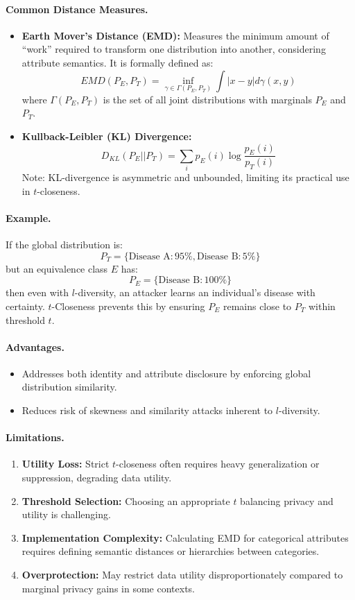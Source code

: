 \documentclass{article}
\begin{document}
\paragraph{Common Distance Measures.}
\begin{itemize}
    \item \textbf{Earth Mover's Distance (EMD):} Measures the minimum amount of ``work'' required to transform one distribution into another, considering attribute semantics. It is formally defined as:
    \[
    EMD(P_E, P_T) = \inf_{\gamma \in \Gamma(P_E, P_T)} \int |x-y| d\gamma(x,y)
    \]
    where $\Gamma(P_E, P_T)$ is the set of all joint distributions with marginals $P_E$ and $P_T$.

    \item \textbf{Kullback-Leibler (KL) Divergence:}
    \[
    D_{KL}(P_E || P_T) = \sum_{i} p_E(i) \log \frac{p_E(i)}{p_T(i)}
    \]
    Note: KL-divergence is asymmetric and unbounded, limiting its practical use in $t$-closeness.

\end{itemize}

\paragraph{Example.}
If the global distribution is:
\[
P_T = \{ \text{Disease A}: 95\%, \text{Disease B}: 5\% \}
\]
but an equivalence class $E$ has:
\[
P_E = \{ \text{Disease B}: 100\% \}
\]
then even with $l$-diversity, an attacker learns an individual's disease with certainty. $t$-Closeness prevents this by ensuring $P_E$ remains close to $P_T$ within threshold $t$.

\paragraph{Advantages.}
\begin{itemize}
    \item Addresses both identity and attribute disclosure by enforcing global distribution similarity.
    \item Reduces risk of skewness and similarity attacks inherent to $l$-diversity.
\end{itemize}

\paragraph{Limitations.}
\begin{enumerate}
    \item \textbf{Utility Loss:} Strict $t$-closeness often requires heavy generalization or suppression, degrading data utility.
    \item \textbf{Threshold Selection:} Choosing an appropriate $t$ balancing privacy and utility is challenging.
    \item \textbf{Implementation Complexity:} Calculating EMD for categorical attributes requires defining semantic distances or hierarchies between categories.
    \item \textbf{Overprotection:} May restrict data utility disproportionately compared to marginal privacy gains in some contexts.
\end{enumerate}
\end{document}
